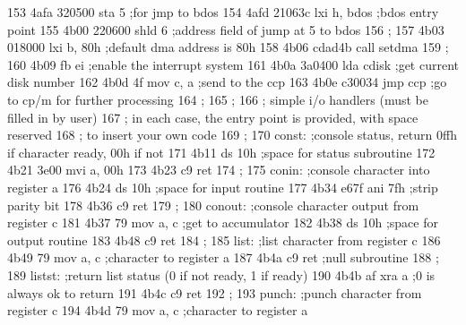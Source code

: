 153      4afa 320500               sta    5              ;for jmp to bdos
154      4afd 21063c               lxi    h, bdos        ;bdos entry point
155      4b00 220600               shld   6              ;address field of jump at 5 to bdos
156                       ;
157      4b03 018000               lxi    b, 80h         ;default dma address is 80h
158      4b06 cdad4b               call   setdma
159                       ;
160      4b09 fb                   ei                    ;enable the interrupt system
161      4b0a 3a0400               lda    cdisk          ;get current disk number
162      4b0d 4f                   mov    c, a           ;send to the ccp
163      4b0e c30034               jmp    ccp            ;go to cp/m for further processing
164                       ;
165                       ;
166                       ;        simple i/o handlers (must be filled in by user)
167                       ;        in each case, the entry point is provided, with space reserved
168                       ;        to insert your own code
169                       ; 
170                       const:   ;console status, return 0ffh if character ready, 00h if not
171      4b11                      ds     10h            ;space for status subroutine
172      4b21 3e00                 mvi    a, 00h
173      4b23 c9                   ret
174                       ;
175                       conin:   ;console character into register a
176      4b24                      ds     10h            ;space for input routine
177      4b34 e67f                 ani    7fh            ;strip parity bit
178      4b36 c9                   ret
179                       ;
180                       conout:  ;console character output from register c
181      4b37 79                   mov    a, c           ;get to accumulator
182      4b38                      ds     10h            ;space for output routine
183      4b48 c9                   ret
184                       ;
185                       list:    ;list character from register c
186      4b49 79                   mov    a, c           ;character to register a
187      4b4a c9                   ret                   ;null subroutine
188                       ;
189                       listst:  ;return list status (0 if not ready, 1 if ready)
190      4b4b af                   xra    a              ;0 is always ok to return
191      4b4c c9                   ret
192                       ;
193                       punch:   ;punch character from register c
194      4b4d 79                   mov    a, c           ;character to register a
